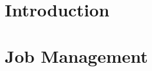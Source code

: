 \documentclass{easychair}
\begin{document}
\tableofcontents
\clearpage

\section{Introduction}
\label{sect:introduction}



\section{Job Management}
\label{sect:job-management}


\end{document}
